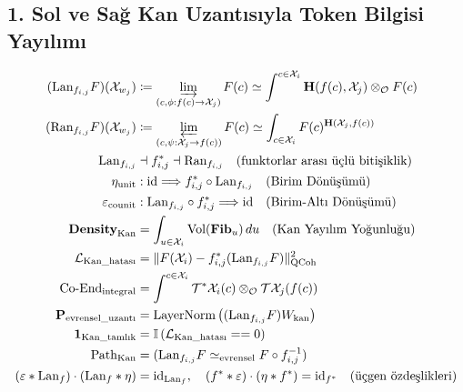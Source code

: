 \documentclass[11pt, a4paper]{article}
\begin{document}
\subsection{1. Sol ve Sağ Kan Uzantısıyla Token Bilgisi Yayılımı}
\begin{align}
(\text{Lan}_{f_{i,j}} F)(\mathcal{X}_{w_j}) &\coloneqq \varinjlim_{(c, \phi : f(c) \to \mathcal{X}_j)} F(c) \simeq \int^{c \in \mathcal{X}_i} \mathbf{H}(f(c), \mathcal{X}_j) \otimes_{\mathcal{O}} F(c) \\
(\text{Ran}_{f_{i,j}} F)(\mathcal{X}_{w_j}) &\coloneqq \varprojlim_{(c, \psi : \mathcal{X}_j \to f(c))} F(c) \simeq \int_{c \in \mathcal{X}_i} F(c)^{\mathbf{H}(\mathcal{X}_j, f(c))} \\
\text{Lan}_{f_{i,j}} &\dashv f_{i,j}^* \dashv \text{Ran}_{f_{i,j}} \quad (\text{funktorlar arası üçlü bitişiklik}) \\
\eta_{\text{unit}} &: \text{id} \Longrightarrow f_{i,j}^* \circ \text{Lan}_{f_{i,j}} \quad (\text{Birim Dönüşümü}) \\
\varepsilon_{\text{counit}} &: \text{Lan}_{f_{i,j}} \circ f_{i,j}^* \Longrightarrow \text{id} \quad (\text{Birim-Altı Dönüşümü}) \\
\mathbf{Density}_{\text{Kan}} &= \int_{u \in \mathcal{X}_i} \text{Vol}(\mathbf{Fib}_u) \, du \quad (\text{Kan Yayılım Yoğunluğu}) \\
\mathcal{L}_{\text{Kan\_hatası}} &= \| F(\mathcal{X}_i) - f_{i,j}^* (\text{Lan}_{f_{i,j}} F) \|_{\text{QCoh}}^2 \\
\text{Co-End}_{\text{integral}} &= \int^{c \in \mathcal{X}_i} \mathcal{T}^*\mathcal{X}_i(c) \otimes_{\mathcal{O}} \mathcal{T}\mathcal{X}_j(f(c)) \\
\mathbf{P}_{\text{evrensel\_uzantı}} &= \text{LayerNorm}\left( (\text{Lan}_{f_{i,j}} F) W_{\text{kan}} \right) \\
\mathbf{1}_{\text{Kan\_tamlık}} &= \mathbb{I}\left( \mathcal{L}_{\text{Kan\_hatası}} == 0 \right) \\
\text{Path}_{\text{Kan}} &= (\text{Lan}_{f_{i,j}} F \simeq_{\text{evrensel}} F \circ f_{i,j}^{-1}) \\
(\varepsilon \ast \text{Lan}_f) \cdot (\text{Lan}_f \ast \eta) &= \mathrm{id}_{\text{Lan}_f}, \quad (f^* \ast \varepsilon) \cdot (\eta \ast f^*) = \mathrm{id}_{f^*} \quad (\text{üçgen özdeşlikleri})
\end{align}
\end{document}
